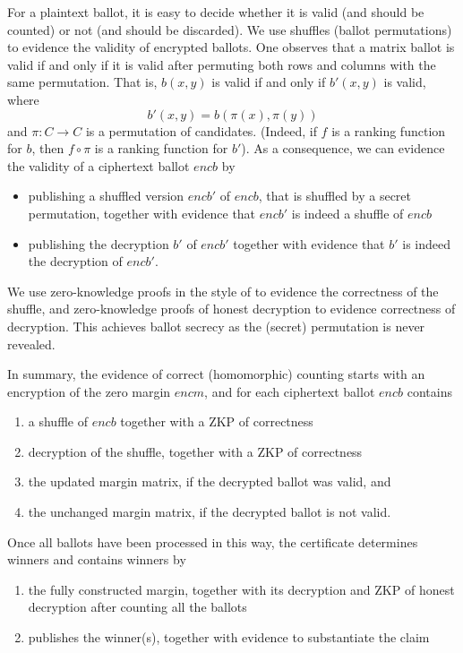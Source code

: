 For a plaintext ballot, it is easy to decide whether it is
valid (and should be counted) or not (and should be discarded). We
use shuffles (ballot permutations) to evidence the validity of
encrypted ballots. One observes that a matrix ballot is valid if and
only if it is valid after permuting both rows and columns with the
same permutation. That is, $b(x,y)$ is valid if and only if $b'(x,y)$
is valid, where
\[ b'(x,y) = b(\pi(x), \pi(y)) \]
and $\pi: C \to C$ is a permutation of candidates. (Indeed, if $f$
is a ranking function for $b$, then $f \circ \pi$ is a ranking
function for $b'$). As a consequence, we can evidence the validity
of a ciphertext ballot $encb$ by
\begin{itemize}
  \item publishing a shuffled version $encb'$ of $encb$, that is
  shuffled by a secret permutation, together with
  evidence that $encb'$ is indeed a shuffle of $encb$
  \item publishing the decryption $b'$ of $encb'$ together with
  evidence that $b'$ is indeed the decryption of $encb'$.
\end{itemize}

\noindent
We use zero-knowledge proofs in the style of \citep{DBLP:conf/africacrypt/TereliusW10}
to evidence the correctness of the shuffle, and zero-knowledge
proofs of honest decryption \citep{DBLP:conf/crypto/ChaumP92} to evidence
correctness of decryption. This achieves ballot secrecy as
the (secret) permutation is never revealed.

In summary, the evidence of correct (homomorphic) counting starts
with an encryption of the zero margin $encm$, and for each
ciphertext ballot $encb$ contains
\begin{enumerate}
\item \label{it:shuff} a shuffle of $encb$ together with a ZKP of 
correctness
\item decryption of the  shuffle, together with a ZKP of
correctness
\item \label{it:upd-marg} the updated margin matrix, if the decrypted ballot
was valid, and
\item the unchanged margin matrix, if the decrypted
ballot is not valid.
\setcounter{mycnt}{\value{enumi}}
\end{enumerate}
Once all ballots have been processed in this way, the certificate
determines winners and contains
winners by
\begin{enumerate}
\setcounter{enumi}{\value{mycnt}}
\item \label{it:pub-dm} the fully constructed margin, together with its decryption  
  and ZKP of honest decryption after counting all the ballots     
\item publishes the winner(s), together with evidence to substantiate the
    claim
\end{enumerate}

